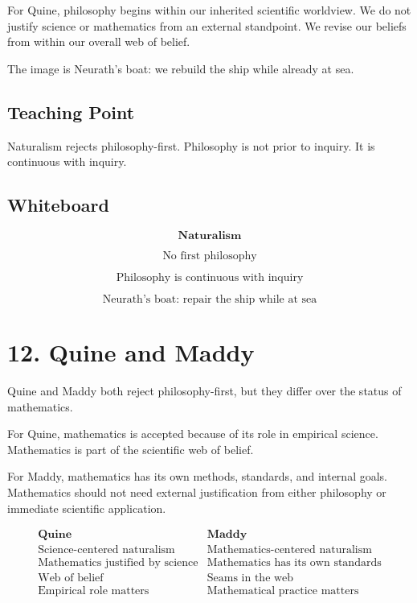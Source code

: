 \documentclass[11pt]{article}
\begin{document}
For Quine, philosophy begins within our inherited scientific worldview. We do not justify
science or mathematics from an external standpoint. We revise our beliefs from within our
overall web of belief.

The image is Neurath's boat: we rebuild the ship while already at sea.

\subsection*{Teaching Point}

Naturalism rejects philosophy-first. Philosophy is not prior to inquiry. It is continuous with
inquiry.

\subsection*{Whiteboard}

\[
\textbf{Naturalism}
\]

\[
\text{No first philosophy}
\]

\[
\text{Philosophy is continuous with inquiry}
\]

\[
\text{Neurath's boat: repair the ship while at sea}
\]

\section*{12. Quine and Maddy}

Quine and Maddy both reject philosophy-first, but they differ over the status of
mathematics.

For Quine, mathematics is accepted because of its role in empirical science. Mathematics is
part of the scientific web of belief.

For Maddy, mathematics has its own methods, standards, and internal goals.
Mathematics should not need external justification from either philosophy or immediate
scientific application.

\[
\begin{array}{c|c}
\textbf{Quine} & \textbf{Maddy} \\
\hline
\text{Science-centered naturalism} & \text{Mathematics-centered naturalism} \\
\text{Mathematics justified by science} & \text{Mathematics has its own standards} \\
\text{Web of belief} & \text{Seams in the web} \\
\text{Empirical role matters} & \text{Mathematical practice matters}
\end{array}
\]
\end{document}
